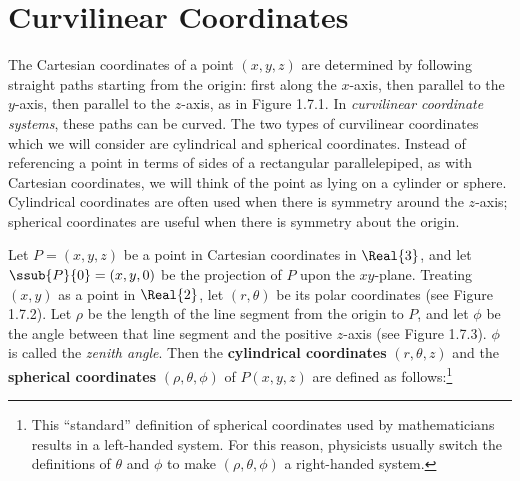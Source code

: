 \section{Curvilinear Coordinates}
\piccaption[]{}
The Cartesian coordinates of a point $(x,y,z)$ are determined by following straight paths starting
from the origin: first along the $x$-axis, then parallel to the $y$-axis, then parallel to the $z$-axis, as in
Figure 1.7.1. In \emph{curvilinear coordinate systems}, these paths can be curved.
The two types of curvilinear coordinates which we will consider are cylindrical and
spherical coordinates.
Instead of referencing a point in terms of sides of a rectangular parallelepiped, as with Cartesian coordinates, we will
think of the point as lying on a cylinder or sphere.
Cylindrical coordinates are often used when there is symmetry around the $z$-axis; spherical
coordinates are useful when there is symmetry about the origin.

Let $P = (x,y,z)$ be
a point in Cartesian coordinates in $\Real{3}$, and let $\ssub{P}{0} = (x,y,0)$ be the projection of $P$ upon the
$xy$-plane. Treating $(x,y)$ as a point in $\Real{2}$, let $(r,\theta)$ be its polar coordinates (see
Figure 1.7.2). Let
$\rho$ be the length of the line segment from the origin to $P$, and let $\phi$ be the angle between that line segment
and the positive $z$-axis (see Figure 1.7.3). $\phi$ is called the \emph{zenith angle}. Then the
\textbf{cylindrical coordinates} $(r,\theta,z)$  and the \textbf{spherical coordinates} $ (\rho,\theta,\phi)$ of
$P(x,y,z)$ are defined as follows:\footnote{This ``standard'' definition of
spherical coordinates used by mathematicians results in a
left-handed system. For this reason, physicists usually switch the definitions
of $\theta$ and $\phi$ to make $(\rho,\theta,\phi)$ a right-handed system.}\vspace{2mm}


